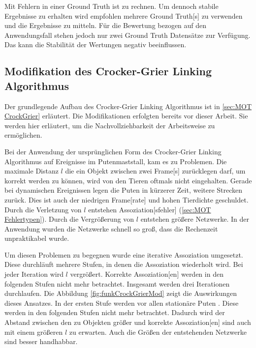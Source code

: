 Mit Fehlern in einer \gls{Ground Truth} ist zu rechnen. Um dennoch stabile Ergebnisse zu erhalten wird empfohlen mehrere \gls{Ground Truth}[s] zu verwenden und die Ergebnisse zu mitteln. Für die Bewertung bezogen auf den Anwendungsfall stehen jedoch nur zwei \gls{Ground Truth} Datensätze zur Verfügung. Das kann die Stabilität der Wertungen negativ beeinflussen.


\subsection{Modifikation des Crocker-Grier Linking Algorithmus} \label{sec:Meth CrockGrieMods}
Der grundlegende Aufbau des Crocker-Grier Linking Algorithmus ist in \ref{sec:MOT CrockGrier} erläutert. Die Modifikationen erfolgten bereits vor dieser Arbeit. Sie werden hier erläutert, um die Nachvollziehbarkeit der Arbeitsweise zu ermöglichen. \par

Bei der Anwendung der ursprünglichen Form des Crocker-Grier Linking Algorithmus auf Ereignisse im Putenmaststall, kam es zu Problemen. Die maximale Distanz \(l\) die ein Objekt zwischen zwei \gls{Frame}[s] zurücklegen darf, um korrekt  werden zu können, wird von den Tieren oftmals nicht eingehalten. Gerade bei dynamischen Ereignissen legen die Puten in kürzerer Zeit, weitere Strecken zurück. Dies ist auch der niedrigen \gls{Frame}[rate] und hohen Tierdichte geschuldet. Durch die Verletzung von \(l\) entstehen \gls{Assoziation}[sfehler] (\ref{sec:MOT Fehlertypen}). Durch die Vergrößerung von \(l\) entstehen größere Netzwerke. In der Anwendung wurden die Netzwerke schnell so groß, dass die Rechenzeit unpraktikabel wurde.\par

Um diesen Problemen zu begegnen wurde eine iterative \gls{Assoziation} umgesetzt. Diese durchläuft mehrere Stufen, in denen die \gls{Assoziation} wiederholt wird. Bei jeder Iteration wird \(l\) vergrößert. Korrekte \gls{Assoziation}[en] werden in den folgenden Stufen nicht mehr betrachtet. Insgesamt werden drei Iterationen durchlaufen. Die Abbildung \ref{fig:funkCrockGrierMod} zeigt die Auswirkungen dieses Ansatzes. In der ersten Stufe werden vor allen stationäre Puten . Diese werden in den folgenden Stufen nicht mehr betrachtet. Dadurch wird der Abstand zwischen den zu  Objekten größer und korrekte \gls{Assoziation}[en] sind auch mit einem größeren \(l\) zu erwarten. Auch die Größen der entstehenden Netzwerke sind besser handhabbar. 

